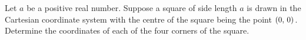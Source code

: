 \documentclass[a4paper,oneside,12pt]{article}
\begin{document}
\begin{problem}
\item\label{prob:square_centre_origin}
  Let $a$ be a positive real number.  Suppose a square of side length
  $a$ is drawn in the Cartesian coordinate system with the centre of
  the square being the point $\left\lparen{0},\, {0}\right\rparen$.  Determine the
  coordinates of each of the four corners of the square.


\end{problem}
\end{document}

